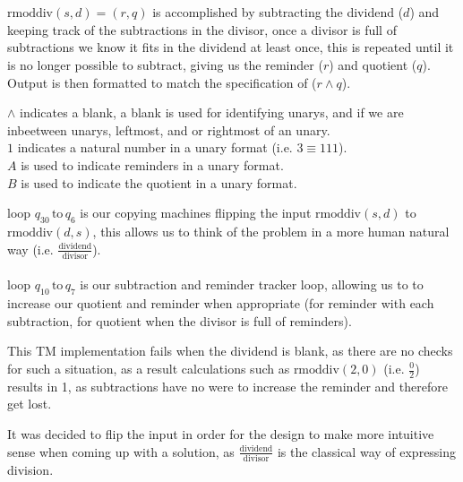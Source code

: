 \documentclass[a4paper]{article} %
\begin{document}
        \section{}
        \begin{tasks}[label={\bfseries\MakeUppercase(\Alph*)},label-width={0.7cm}]
        \task
        $\text{rmoddiv}(s, d) = (r, q)$ is accomplished by subtracting the dividend ($d$) and keeping track of the subtractions in the divisor, once a divisor is full of subtractions we know it fits in the dividend at least once, this is repeated until it is no longer possible to subtract, giving us the reminder ($r$) and quotient ($q$). Output is then formatted to match the specification of ($r \land q$).

        \task
        $\land$ indicates a blank, a blank is used for identifying unarys, and if we are inbeetween unarys, leftmost, and or rightmost of an unary.\\
        $1$ indicates a natural number in a unary format (i.e. $ 3 \equiv 111$).\\
        $A$ is used to indicate reminders in a unary format.\\
        $B$ is used to indicate the quotient in a unary format.

        \task
        loop $q_{30}\, \text{to}\, q_{6}$ is our copying machines flipping the input $\text{rmoddiv}(s, d)$ to $\text{rmoddiv}(d, s)$, this allows us to think of the problem in a more human natural way (i.e. $\frac{\text{dividend}}{\text{divisor}}$).\\\\
        loop $q_{10}\, \text{to}\, q_{7}$ is our subtraction and reminder tracker loop, allowing us to to increase our quotient and reminder when appropriate (for reminder with each subtraction, for quotient when the divisor is full of reminders).

        \task
        This TM implementation fails when the dividend is blank, as there are no checks for such a situation, as a result calculations such as $\text{rmoddiv}(2, 0)$ (i.e. $\frac{0}{2}$) results in 1, as subtractions have no were to increase the reminder and therefore get lost.

        \task
        It was decided to flip the input in order for the design to make more intuitive sense when coming up with a solution, as $\frac{\text{dividend}}{\text{divisor}}$ is the classical way of expressing division.
        \end{tasks}
\end{document}
